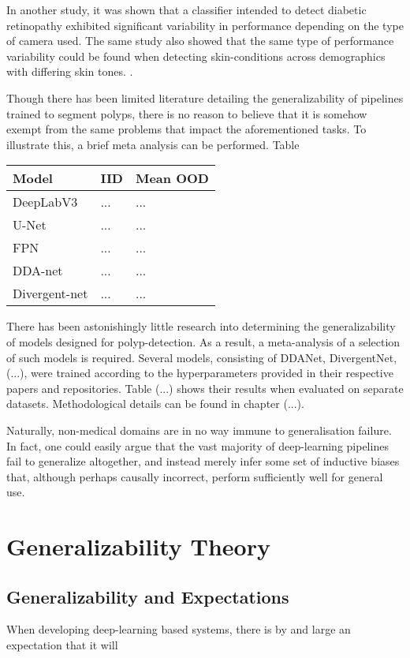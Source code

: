	In another study, it was shown that a classifier intended to detect diabetic retinopathy exhibited significant variability in performance depending on the type of camera used. The same study also showed that the same type of performance variability could be found when detecting skin-conditions across demographics with differing skin tones. \cite{damour2020underspecification}. 
	
	Though there has been limited literature detailing the generalizability of pipelines trained to segment polyps, there is no reason to believe that it is somehow exempt from the same problems that impact the aforementioned tasks. To illustrate this, a brief meta analysis can be performed. Table
	\begin{table}
		\centering
		\begin{tabularx}{\textwidth}{X | X X}
			Model & IID & Mean OOD \\
			\hline
			DeepLabV3 & ... & ... \\
			U-Net & ... & ... \\
			FPN & ... & ... \\
			DDA-net & ... & ... \\
			Divergent-net & ... & ...\\
		\end{tabularx}
				\label{table:polyp-case}
	\end{table}
	There has been astonishingly little research into determining the generalizability of models designed for polyp-detection. As a result, a meta-analysis of a selection of such models is required. Several models, consisting of DDANet, DivergentNet, (...), were trained according to the hyperparameters provided in their respective papers and repositories. Table (...) shows their results when evaluated on separate datasets. Methodological details can be found in chapter (...). 

	Naturally, non-medical domains are in no way immune to generalisation failure. In fact, one could easily argue that the vast majority of deep-learning pipelines fail to generalize altogether, and instead merely infer some set of inductive biases that, although perhaps causally incorrect, perform sufficiently well for general use. 
	
\section{Generalizability Theory}
	\subsection{Generalizability and Expectations}
		When developing deep-learning based systems, there is by and large an expectation that it will 
